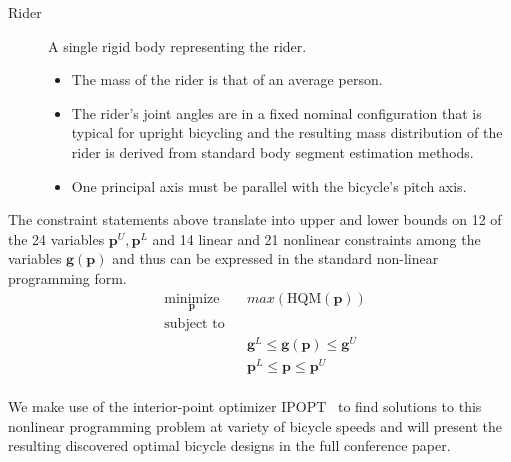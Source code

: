 \documentclass{bmd2019a}
\begin{document}
\begin{description}
  \item[Rider] A single rigid body representing the rider.
    \begin{itemize}
      \itemsep0em
      \item The mass of the rider is that of an average person.
      \item The rider's joint angles are in a fixed nominal configuration that
        is typical for upright bicycling and the resulting mass distribution of
        the rider is derived from standard body segment estimation methods.
      \item One principal axis must be parallel with the bicycle's pitch axis.
    \end{itemize}

\end{description}

The constraint statements above translate into upper and lower bounds on 12 of
the 24 variables $\mathbf{p}^U,\mathbf{p}^L$ and 14 linear and 21 nonlinear
constraints among the variables $\mathbf{g}(\mathbf{p})$ and thus can be
expressed in the standard non-linear programming form.
%
\begin{equation}
  \begin{aligned}
    & \underset{\mathbf{p}}{\text{minimize}} & & max(\textrm{HQM}(\mathbf{p})) \\
    & \text{subject to} & & \\
    & & & \mathbf{g}^L \leq \mathbf{g}(\mathbf{p}) \leq \mathbf{g}^U \\
    & & & \mathbf{p}^L \leq \mathbf{p} \leq \mathbf{p}^U \\
  \end{aligned}
\end{equation}

We make use of the interior-point optimizer IPOPT~\cite{Wachter2006} to find
solutions to this nonlinear programming problem at variety of bicycle speeds
and will present the resulting discovered optimal bicycle designs in the full
conference paper.



\end{document}
